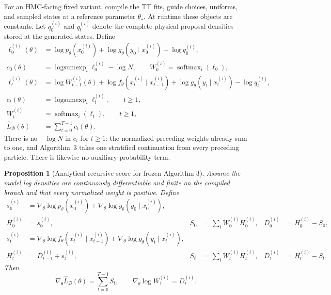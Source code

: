 \documentclass[11pt]{article}
\newtheorem{proposition}{Proposition}
\begin{document}
For an HMC-facing fixed variant, compile the TT fits, guide choices, uniforms,
and sampled states at a reference parameter $\theta_\star$.  At runtime these
objects are constants.  Let $q_0^{(i)}$ and $q_t^{(i)}$ denote the complete
physical proposal densities stored at the generated states.  Define
\begin{align}
 \ell_0^{(i)}(\theta)
 &=\log p_\theta(x_0^{(i)})+
   \log g_\theta(y_0\mid x_0^{(i)})-\log q_0^{(i)},\\
 c_0(\theta)&=\operatorname{logsumexp}_i\ell_0^{(i)}-\log N,
 \qquad W_0^{(i)}=\operatorname{softmax}_i(\ell_0),
 \label{eq:algthree-initial-log-weight}\\
 \ell_t^{(i)}(\theta)
 &=\log W_{t-1}^{(i)}(\theta)
  +\log f_\theta(x_t^{(i)}\mid x_{t-1}^{(i)})
  +\log g_\theta(y_t\mid x_t^{(i)})-\log q_t^{(i)},\\
 c_t(\theta)&=\operatorname{logsumexp}_i\ell_t^{(i)},\qquad t\geq1,
 \label{eq:algthree-transition-log-weight}\\
 W_t^{(i)}&=\operatorname{softmax}_i(\ell_t),\qquad t\geq1,\\
 \widehat L_{\mathcal B}(\theta)&=\sum_{t=0}^{T-1}c_t(\theta).
 \label{eq:algthree-frozen-scalar}
\end{align}
There is no $-\log N$ in $c_t$ for $t\geq1$: the normalized preceding
weights already sum to one, and Algorithm~3 takes one stratified continuation
from every preceding particle.  There is likewise no auxiliary-probability
term.

\begin{proposition}[Analytical recursive score for frozen Algorithm 3]
\label{prop:algthree-score}
Assume the model log densities are continuously differentiable and finite on
the compiled branch and that every normalized weight is positive.  Define
\begin{align}
 s_0^{(i)}&=\nabla_\theta\log p_\theta(x_0^{(i)})
            +\nabla_\theta\log g_\theta(y_0\mid x_0^{(i)}),\\
 H_0^{(i)}&=s_0^{(i)},
 &S_0&=\sum_iW_0^{(i)}H_0^{(i)},
 &D_0^{(i)}&=H_0^{(i)}-S_0,\\
 s_t^{(i)}&=\nabla_\theta\log f_\theta(x_t^{(i)}\mid x_{t-1}^{(i)})
            +\nabla_\theta\log g_\theta(y_t\mid x_t^{(i)}),\\
 H_t^{(i)}&=D_{t-1}^{(i)}+s_t^{(i)},
 &S_t&=\sum_iW_t^{(i)}H_t^{(i)},
 &D_t^{(i)}&=H_t^{(i)}-S_t.
 \label{eq:algthree-score-recursion}
\end{align}
Then
\begin{equation}
 \nabla_\theta\widehat L_{\mathcal B}(\theta)=\sum_{t=0}^{T-1}S_t,
 \qquad
 \nabla_\theta\log W_t^{(i)}=D_t^{(i)}.
 \label{eq:algthree-score-result}
\end{equation}
\end{proposition}
\end{document}
